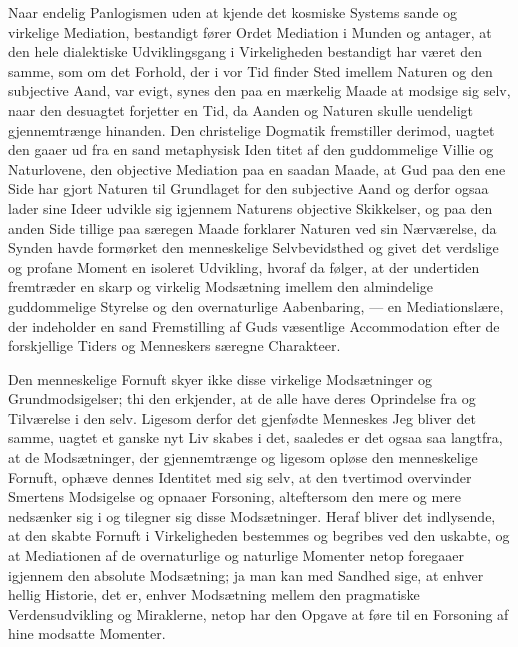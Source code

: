 \documentclass[12pt]{book}
\newcommand{\opage}[1]{\marginnote{\footnotesize\textit{[#1]}}}
\begin{document}
Naar endelig Panlogismen uden at kjende det kosmiske Systems sande og virkelige
Mediation, bestandigt fører Ordet Mediation i Munden og antager, at den hele
dialektiske Udviklingsgang i Virkeligheden bestandigt har været den samme, som om
det Forhold, der i vor Tid finder Sted imellem Naturen og den subjective Aand,
var evigt, synes den paa en mærkelig Maade at modsige sig selv, naar den
desuagtet forjetter en Tid, da Aanden og Naturen skulle uendeligt gjennemtrænge
hinanden. Den christelige Dogmatik fremstiller derimod, uagtet den gaaer ud fra
en sand metaphysisk Iden\-%
\opage{149}titet af den guddommelige Villie og Naturlovene, den objective Mediation paa en
saadan Maade, at Gud paa den ene Side har gjort Naturen til Grundlaget for den
subjective Aand og derfor ogsaa lader sine Ideer udvikle sig igjennem Naturens
objective Skikkelser, og paa den anden Side tillige paa særegen Maade forklarer
Naturen ved sin Nærværelse, da Synden havde formørket den menneskelige
Selvbevidsthed og givet det verdslige og profane Moment en isoleret Udvikling,
hvoraf da følger, at der undertiden fremtræder en skarp og virkelig Modsætning
imellem den almindelige guddommelige Styrelse og den overnaturlige Aabenbaring,
--- en Mediationslære, der indeholder en sand Fremstilling af Guds væsentlige
Accommodation efter de forskjellige Tiders og Menneskers særegne Charakteer.

Den menneskelige Fornuft skyer ikke disse virkelige Modsætninger og
Grundmodsigelser; thi den erkjender, at de alle have deres Oprindelse fra og
Tilværelse i den selv. Ligesom derfor det gjenfødte Menneskes Jeg bliver det
samme, uagtet et ganske nyt Liv skabes i det, saaledes er det ogsaa saa langtfra,
at de Modsætninger, der gjennemtrænge og ligesom opløse den menneskelige Fornuft,
ophæve dennes Identitet med sig selv, at den tvertimod overvinder Smertens
Modsigelse og opnaaer Forsoning, alteftersom den mere og mere nedsænker sig i og
tilegner sig disse Modsætninger. Heraf bliver det indlysende, at den skabte
Fornuft i Virkeligheden bestemmes og begribes ved den uskabte, og at Mediationen
af de overnaturlige og naturlige Momenter netop foregaaer igjennem den absolute
Modsætning; ja man kan med Sandhed sige, at enhver hellig Historie, det er,
enhver Modsætning mellem den pragmatiske Verdensudvikling og Miraklerne, netop
har den Opgave at føre til en Forsoning af hine modsatte Momenter.
\end{document}
